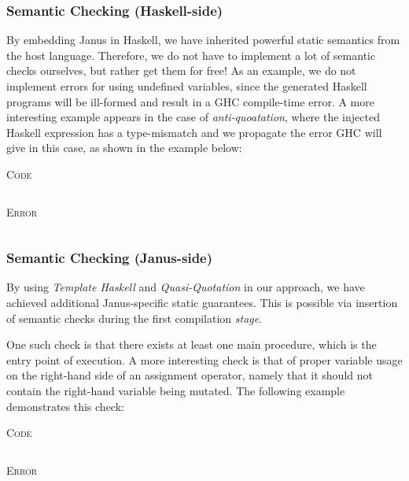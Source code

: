 \documentclass[12pt,a4paper]{article}
\newcommand{\code}[2]{
 \begin{center} \textsc{\small #1} \end{center}
 \inputminted[frame=lines,framesep=.5cm,baselinestretch=.8,linenos,fontsize=\footnotesize]
         {haskell}{code/#2.hs}
}
\newcommand{\codeErr}[1]{
 \begin{center} \textsc{\small Error} \end{center}
 \inputminted[frame=lines,framesep=.5cm,baselinestretch=.8,fontsize=\footnotesize]
         {bash}{code/#1_err.hs}
}
\begin{document}
\subsubsection{Semantic Checking (Haskell-side)}
By embedding Janus in Haskell, we have inherited powerful static semantics from the host language. Therefore, we do not have to implement a lot of semantic checks ourselves, but rather get them for free! As an example, we do not implement errors for using undefined variables, since the generated Haskell programs will be ill-formed and result in a GHC compile-time error. A more interesting example appears in the case of \textit{anti-quoatation}, where the injected Haskell expression has a type-mismatch and we propagate the error GHC will give in this case, as shown in the example below:
\\[10pt]
\hspace*{.05\textwidth}
\begin{minipage}{.4\textwidth}
\code{Code}{semH}
\end{minipage}
\hspace*{.05\textwidth}
\begin{minipage}{.5\textwidth}
\codeErr{semH}
\end{minipage}

\subsubsection{Semantic Checking (Janus-side)}
By using \textit{Template Haskell} and \textit{Quasi-Quotation} in our approach, we have achieved additional Janus-specific static guarantees. This is possible via insertion of semantic checks during the first compilation \textit{stage}.

One such check is that there exists at least one main procedure, which is the entry point of execution. A more interesting check is that of proper variable usage on the right-hand side of an assignment operator, namely that it should not contain the right-hand variable being mutated. The following example demonstrates this check:

\begin{minipage}{.3\textwidth}
\code{Code}{semJ}
\end{minipage}
\hspace*{.2\textwidth}
\begin{minipage}{.5\textwidth}
\codeErr{semJ}
\end{minipage}
    
\end{document}
